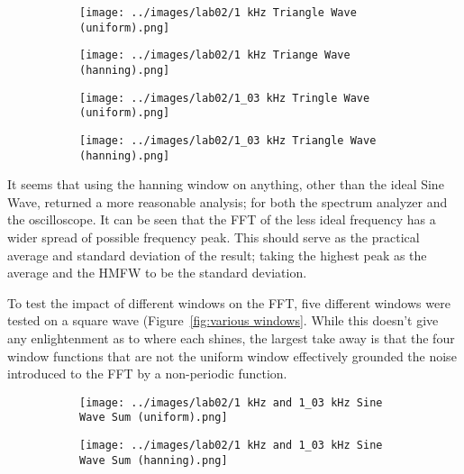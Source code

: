 \documentclass[12pt]{article}
\begin{document}
\begin{figure}[!ht]
    \centering
    \begin{subfigure}[h]{\textwidth}
    \texttt{[image: ../images/lab02/1 kHz Triangle Wave (uniform).png]}
    \caption{}
    \label{fig:1 triangle uniform}
    \end{subfigure}
    \begin{subfigure}[h]{\textwidth}
    \texttt{[image: ../images/lab02/1 kHz Triange Wave (hanning).png]}
    \caption{}
    \label{fig:1 triangle hanning}
    \end{subfigure}
    \begin{subfigure}[h]{\textwidth}
    \texttt{[image: ../images/lab02/1\_03 kHz Tringle Wave (uniform).png]}
    \caption{}
    \label{fig:1.03 triangle uniform}
    \end{subfigure}
    \begin{subfigure}[h]{\textwidth}
    \texttt{[image: ../images/lab02/1\_03 kHz Triangle Wave (hanning).png]}
    \caption{}
    \label{fig:1.03 triangle hanning}
    \end{subfigure}
\end{figure} %

It seems that using the hanning window on anything, other than the ideal Sine Wave, returned a more reasonable analysis; for both the spectrum analyzer and the oscilloscope. It can be seen that the FFT of the less ideal frequency has a wider spread of possible frequency peak. This should serve as the practical average and standard deviation of the result; taking the highest peak as the average and the HMFW to be the standard deviation.

To test the impact of different windows on the FFT, five different windows were tested on a square wave (Figure~\ref{fig:various windows}. While this doesn't give any enlightenment as to where each shines, the largest take away is that the four window functions that are not the uniform window effectively grounded the noise introduced to the FFT by a non-periodic function.  

\begin{figure}[!ht]
    \centering
    \begin{subfigure}[h]{\textwidth}
    \texttt{[image: ../images/lab02/1 kHz and 1\_03 kHz Sine Wave Sum (uniform).png]}
    \caption{}
    \label{fig:sine sum}
    \end{subfigure}
    \begin{subfigure}[h]{\textwidth}
    \texttt{[image: ../images/lab02/1 kHz and 1\_03 kHz Sine Wave Sum (hanning).png]}
    \caption{}
    \label{fig:sine sum}
    \end{subfigure}
\end{figure} %
\end{document}
